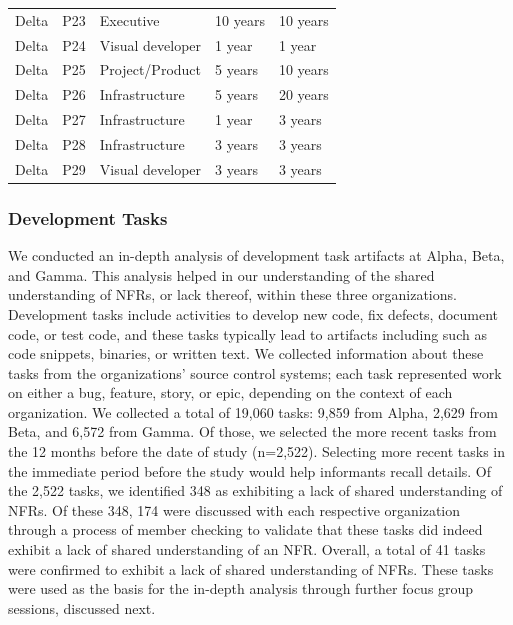 \documentclass[smallextended]{svjour3}        %
\begin{document}
\begin{table}[!h]
\begin{tabular}{p{1.5cm}p{0.6cm}p{2.5cm}p{3.5cm}p{2cm}}
Delta & P23 & Executive & 10 years & 10 years\\
Delta & P24 & Visual developer & 1 year & 1 year\\
Delta & P25 & Project/Product & 5 years & 10 years\\
Delta & P26 & Infrastructure & 5 years & 20 years\\
Delta & P27 & Infrastructure & 1 year & 3 years\\
Delta & P28 & Infrastructure & 3 years & 3 years\\
Delta & P29 & Visual developer & 3 years & 3 years\\


\bottomrule
\end{tabular}

\end{table}




\subsubsection{Development Tasks}
\label{dev_tasks}
We conducted an in-depth analysis of development task artifacts at Alpha, Beta, and Gamma. This analysis helped in our understanding of the shared understanding of NFRs, or lack thereof, within these three organizations.
Development tasks include activities to develop new code, fix defects, document code, or test code, and these tasks typically lead to artifacts including such as code snippets, binaries, or written text. 
We collected information about these tasks from the organizations' source control systems; 
each task represented work on either a bug, feature, story, or epic, depending on the context of each organization.
We collected a total of 19,060 tasks: 9,859 from Alpha, 2,629 from Beta, and 6,572 from Gamma. Of those, we selected the more recent tasks from the 12 months before the date of study (n=2,522). Selecting more recent tasks in the immediate period before the study would help informants recall details. Of the 2,522 tasks, we identified 348 as exhibiting a lack of shared understanding of NFRs. 
Of these 348, 174 were discussed with each respective organization through a process of member checking to validate that these tasks did indeed exhibit a lack of shared understanding of an NFR. %
Overall, a total of 41 tasks were confirmed to exhibit a lack of shared understanding of NFRs.
These tasks were used as the basis for the in-depth analysis through further focus group sessions, discussed next. 
\end{document}

